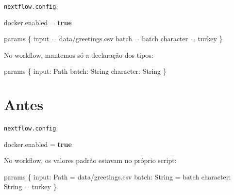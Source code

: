\documentclass[
  brazilian,
  letterpaper,
  DIV=11,
  numbers=noendperiod]{scrreprt}
\newenvironment{Shaded}{\begin{snugshade}}{\end{snugshade}}
\newcommand{\BuiltInTok}[1]{\textcolor[rgb]{0.00,0.23,0.31}{#1}}
\newcommand{\KeywordTok}[1]{\textcolor[rgb]{0.00,0.23,0.31}{\textbf{#1}}}
\newcommand{\NormalTok}[1]{\textcolor[rgb]{0.00,0.23,0.31}{#1}}
\newcommand{\OperatorTok}[1]{\textcolor[rgb]{0.37,0.37,0.37}{#1}}
\newcommand{\StringTok}[1]{\textcolor[rgb]{0.13,0.47,0.30}{#1}}
\begin{document}
\texttt{nextflow.config}:

\begin{Shaded}
\begin{Highlighting}[]
\NormalTok{docker}\OperatorTok{.}\NormalTok{enabled }\OperatorTok{=} \KeywordTok{true}

\NormalTok{params }\OperatorTok{\{}
\NormalTok{    input     }\OperatorTok{=} \StringTok{\textquotesingle{}data/greetings.csv\textquotesingle{}}
\NormalTok{    batch     }\OperatorTok{=} \StringTok{\textquotesingle{}batch\textquotesingle{}}
\NormalTok{    character }\OperatorTok{=} \StringTok{\textquotesingle{}turkey\textquotesingle{}}
\OperatorTok{\}}
\end{Highlighting}
\end{Shaded}

No workflow, mantemos só a declaração dos tipos:

\begin{Shaded}
\begin{Highlighting}[]
\NormalTok{params }\OperatorTok{\{}
\NormalTok{    input}\OperatorTok{:}\NormalTok{ Path}
\NormalTok{    batch}\OperatorTok{:} \BuiltInTok{String}
\NormalTok{    character}\OperatorTok{:} \BuiltInTok{String}
\OperatorTok{\}}
\end{Highlighting}
\end{Shaded}

\section{Antes}

\texttt{nextflow.config}:

\begin{Shaded}
\begin{Highlighting}[]
\NormalTok{docker}\OperatorTok{.}\NormalTok{enabled }\OperatorTok{=} \KeywordTok{true}
\end{Highlighting}
\end{Shaded}

No workflow, os valores padrão estavam no próprio script:

\begin{Shaded}
\begin{Highlighting}[]
\NormalTok{params }\OperatorTok{\{}
\NormalTok{    input}\OperatorTok{:}\NormalTok{ Path     }\OperatorTok{=} \StringTok{\textquotesingle{}data/greetings.csv\textquotesingle{}}
\NormalTok{    batch}\OperatorTok{:} \BuiltInTok{String}   \OperatorTok{=} \StringTok{\textquotesingle{}batch\textquotesingle{}}
\NormalTok{    character}\OperatorTok{:} \BuiltInTok{String} \OperatorTok{=} \StringTok{\textquotesingle{}turkey\textquotesingle{}}
\OperatorTok{\}}
\end{Highlighting}
\end{Shaded}
\end{document}
